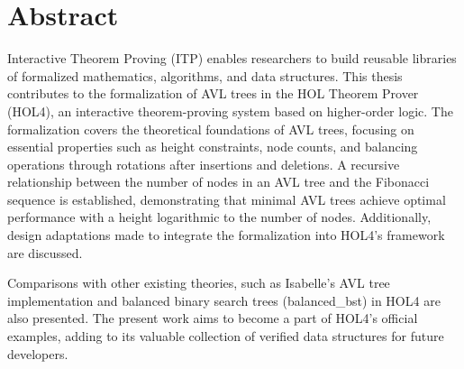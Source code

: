 \chapter*{Abstract}

Interactive Theorem Proving (ITP) enables researchers to build reusable libraries of formalized mathematics, algorithms, and data structures. This thesis contributes to the formalization of AVL trees in the HOL Theorem Prover (HOL4), an interactive theorem-proving system based on higher-order logic. The formalization covers the theoretical foundations of AVL trees, focusing on essential properties such as height constraints, node counts, and balancing operations through rotations after insertions and deletions. A recursive relationship between the number of nodes in an AVL tree and the Fibonacci sequence is established, demonstrating that minimal AVL trees achieve optimal performance with a height logarithmic to the number of nodes. Additionally, design adaptations made to integrate the formalization into HOL4’s framework are discussed.

Comparisons with other existing theories, such as Isabelle's AVL tree implementation and balanced binary search trees (balanced\_bst) in HOL4 are also presented. The present work aims to become a part of HOL4's official examples, adding to its valuable collection of verified data structures for future developers.

\newpage